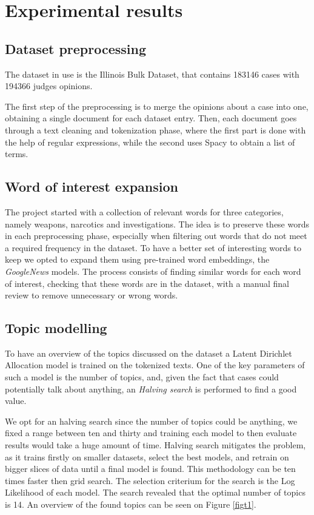 \section{Experimental results}

\subsection{Dataset preprocessing}

The dataset in use is the Illinois Bulk Dataset, that contains 
183146 cases with 194366 judges opinions. 

The first step of the preprocessing is to merge the opinions about a 
case into one, obtaining a single document for each dataset entry.  
Then, each document goes through a text cleaning and tokenization phase, 
where the first part is done with the help of regular expressions, 
while the second uses Spacy to obtain a list of terms.

\subsection{Word of interest expansion}

The project started with a collection of relevant words for three categories, 
namely weapons, narcotics and investigations. The idea is to preserve these words
in each preprocessing phase, especially when filtering out words 
that do not meet a required frequency in the dataset. 
To have a better set of interesting words to keep we opted to expand them 
using pre-trained word embeddings, the \emph{GoogleNews} models.
The process consists of finding similar words for each word 
of interest, checking that these words are in the dataset, 
with a manual final review to remove unnecessary or wrong words.

\subsection{Topic modelling}

To have an overview of the topics discussed on the dataset a Latent 
Dirichlet Allocation model is trained on the tokenized texts.
One of the key parameters of such a model is the number of topics, and, 
given the fact that cases could potentially talk about anything, an 
\emph{Halving search} is performed to find a good value.

We opt for an halving search since the number of topics could be anything, 
we fixed a range between ten and thirty and training each model 
to then evaluate results would take a huge amount of time. Halving search 
mitigates the problem, as it trains firstly on smaller datasets, select 
the best models, and retrain on bigger slices of data until a final model 
is found. This methodology can be ten times faster then grid search. 
The selection criterium for the search is the Log Likelihood of each model.
The search revealed that the optimal number of topics is 14. An overview of the found topics 
can be seen on Figure \vref{figt1}.

